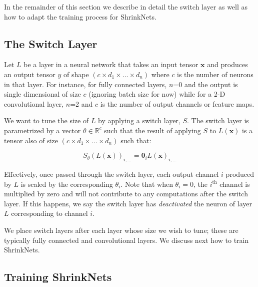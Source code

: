 In the remainder of this section we describe in detail the switch layer as well
as how to adapt the training process for ShrinkNets.

\subsection{The Switch Layer}

Let $L$ be a layer in a neural network that takes an input tensor $\bm{x}$ and
produces an output tensor $y$ of shape $\left(c \times d_1 \times \dots \times
d_n\right)$ where $c$ is the number of neurons in that layer.  For instance, for
fully connected layers, $n$=0 and the output is single dimensional of size $c$
(ignoring batch size for now) while for a 2-D convolutional layer, $n$=2 and $c$
is the number of output channels or feature maps.

We want to tune the size of $L$ by applying a switch layer, $S$. The switch
layer is parametrized by a vector $\theta \in \mathbb{R}^c$ such that the result
of applying $S$ to $L(\bm{x})$ is a tensor also of size $\left(c \times d_1
\times \dots \times d_n\right)$ such that: 


\begin{equation} 
S_{\theta}(L(\bm{x}))_{i,...} = \bm{\theta}_iL(\bm{x})_{i, ...}
\end{equation}

Effectively, once passed through the switch layer, each output channel $i$
produced by $L$ is scaled by the corresponding $\theta_i$. Note that when
$\theta_i = 0$, the $i^{\text{th}}$ channel is multiplied by zero and will not
contribute to any computations after the switch layer. If this happens, we say
the switch layer has {\it deactivated} the neuron of layer $L$ corresponding to
channel $i$. 

We place switch layers after each layer whose size we wish to tune; these are
typically fully connected and convolutional layers. We discuss next how to train
ShrinkNets.

\subsection{Training ShrinkNets} 


